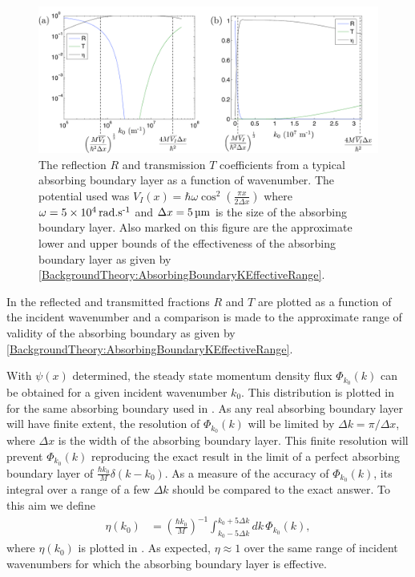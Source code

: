 \begin{figure}
    \centering
    \includegraphics[width=14cm]{AbsorbingBoundaryLayerEffectiveness}
    \caption{\label{MethodsAppendix:AbsorbingBoundaryLayerEffectiveness} The reflection $R$ and transmission $T$ coefficients from a typical absorbing boundary layer as a function of wavenumber. The potential used was $\displaystyle V_I(x) = \hbar \omega \cos^2\left( \frac{\pi x}{2 \Delta x} \right)$ where $\omega = \unit[5 \times 10^4]{rad.s\textsuperscript{-1}}$ and $\Delta x = \unit[5]{\micro m}$ is the size of the absorbing boundary layer. Also marked on this figure are the approximate lower and upper bounds of the effectiveness of the absorbing boundary layer as given by \eqref{BackgroundTheory:AbsorbingBoundaryKEffectiveRange}.}
\end{figure}

In  the reflected and transmitted fractions $R$ and $T$ are plotted as a function of the incident wavenumber and a comparison is made to the approximate range of validity of the absorbing boundary as given by \eqref{BackgroundTheory:AbsorbingBoundaryKEffectiveRange}. 


With $\psi(x)$ determined, the steady state momentum density flux $\Phi_{k_0}(k)$ can be obtained for a given incident wavenumber $k_0$. This distribution is plotted in  for the same absorbing boundary used in . As any real absorbing boundary layer will have finite extent, the resolution of $\Phi_{k_0}(k)$ will be limited by $\Delta k = \pi/\Delta x$, where $\Delta x$ is the width of the absorbing boundary layer. This finite resolution will prevent $\Phi_{k_0}(k)$ reproducing the exact result in the limit of a perfect absorbing boundary layer of $\displaystyle \frac{\hbar k_0}{M}\delta(k - k_0)$. As a measure of the accuracy of $\Phi_{k_0}(k)$, its integral over a range of a few $\Delta k$ should be compared to the exact answer. To this aim we define
\begin{align}
    \eta(k_0) &= \left(\frac{\hbar k_0}{M}\right)^{-1} \int_{k_0-5\Delta k}^{k_0 + 5\Delta k} dk\, \Phi_{k_0}(k),
\end{align}
where $\eta(k_0)$ is plotted in . As expected, $\eta \approx 1$ over the same range of incident wavenumbers for which the absorbing boundary layer is effective.

